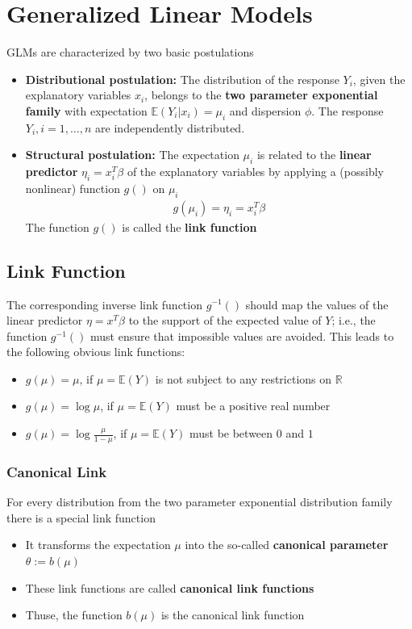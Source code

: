 \section{Generalized Linear Models}
GLMs are characterized by two basic postulations
\begin{itemize}
\item \textbf{Distributional postulation:}
The distribution of the response $Y_i$,
given the explanatory variables $x_i$,
belongs to the \textbf{two parameter exponential family}
with expectation $\mathbb{E}(Y_i|x_i)=\mu_i$ and dispersion $\phi$.
The response $Y_i, i=1,\ldots,n$ are independently distributed.
\item \textbf{Structural postulation:}
The expectation $\mu_i$ is related to the \textbf{linear predictor}
$\eta_i = x_i^T \beta$ of the explanatory variables by applying a (possibly
nonlinear) function $g()$ on $\mu_i$
\begin{align*}
g(\mu_i)
=
\eta_i
=
x_i^T \beta
\end{align*}
The function $g()$ is called the \textbf{link function}
\end{itemize}

\subsection{Link Function}
The corresponding inverse link function $g^{-1}()$
should map the values of the linear predictor $\eta = x^T \beta$
to the support of the expected value of $Y$;
i.e., the function $g^{-1}()$ must ensure that impossible values are avoided.
This leads to the following obvious link functions:
\begin{itemize}
\item $g(\mu) = \mu$, if $\mu = \mathbb{E}(Y)$ is not subject to
any restrictions on $\mathbb{R}$
\item $g(\mu) = \log\mu$, if $\mu = \mathbb{E}(Y)$
must be a positive real number
\item $g(\mu) = \log\frac{\mu}{1-\mu}$, if $\mu = \mathbb{E}(Y)$
must be between $0$ and $1$
\end{itemize}

\subsubsection{Canonical Link}
For every distribution from the two parameter exponential distribution family
there is a special link function
\begin{itemize}
\item It transforms the expectation $\mu$ into the so-called
\textbf{canonical parameter} $\theta := b(\mu)$
\item These link functions are called \textbf{canonical link functions}
\item Thuse, the function $b(\mu)$ is the canonical link function
\end{itemize}

